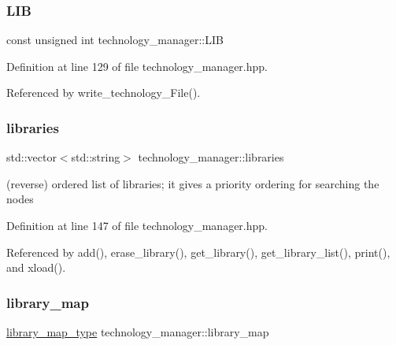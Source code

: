 \subsubsection{\texorpdfstring{L\+IB}{LIB}}
{\footnotesize\ttfamily const unsigned int technology\+\_\+manager\+::\+L\+IB\hspace{0.3cm}{\ttfamily [static]}}



Definition at line 129 of file technology\+\_\+manager.\+hpp.



Referenced by write\+\_\+technology\+\_\+\+File().

\mbox{\label{classtechnology__manager_a3ca0b8fe373cdba4c0e7a92fe44b1380}} 
\subsubsection{\texorpdfstring{libraries}{libraries}}
{\footnotesize\ttfamily std\+::vector$<$std\+::string$>$ technology\+\_\+manager\+::libraries\hspace{0.3cm}{\ttfamily [private]}}



(reverse) ordered list of libraries; it gives a priority ordering for searching the nodes 



Definition at line 147 of file technology\+\_\+manager.\+hpp.



Referenced by add(), erase\+\_\+library(), get\+\_\+library(), get\+\_\+library\+\_\+list(), print(), and xload().

\mbox{\label{classtechnology__manager_ae958fbcf7fa0f7837c8da2af7b6b9e69}} 
\subsubsection{\texorpdfstring{library\+\_\+map}{library\_map}}
{\footnotesize\ttfamily \hyperlink{classtechnology__manager_a97826ddbca97f92f63e34c5ef5948319}{library\+\_\+map\+\_\+type} technology\+\_\+manager\+::library\+\_\+map\hspace{0.3cm}{\ttfamily [private]}}



